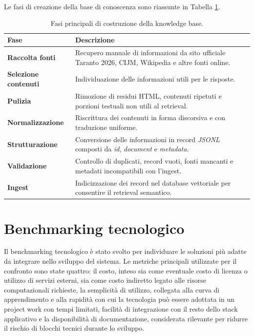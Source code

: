 Le fasi di creazione della base di conoscenza sono riassunte in Tabella \ref{tab:kb-pipeline}.

\begin{table}[H]
\centering
\renewcommand{\arraystretch}{1.25}
\begin{tabular}{p{} p{}}
\toprule
\textbf{Fase} & \textbf{Descrizione} \\
\midrule
\textbf{Raccolta fonti} & Recupero manuale di informazioni da sito ufficiale Taranto 2026, CIJM, Wikipedia e altre fonti online. \\
\textbf{Selezione contenuti} & Individuazione delle informazioni utili per le risposte. \\
\textbf{Pulizia} & Rimozione di residui HTML, contenuti ripetuti e porzioni testuali non utili al retrieval. \\
\textbf{Normalizzazione} & Riscrittura dei contenuti in forma discorsiva e con traduzione uniforme. \\
\textbf{Strutturazione} & Conversione delle informazioni in record \textit{JSONL} composti da \textit{id}, \textit{document} e \textit{metadata}. \\
\textbf{Validazione} & Controllo di duplicati, record vuoti, fonti mancanti e metadati incompatibili con l’ingest. \\
\textbf{Ingest} & Indicizzazione dei record nel database vettoriale per consentire il retrieval semantico. \\
\bottomrule
\end{tabular}
\caption{Fasi principali di costruzione della knowledge base.}\label{tab:kb-pipeline}
\end{table}

\section{Benchmarking tecnologico}

Il benchmarking tecnologico è stato svolto per individuare le soluzioni più adatte da integrare nello sviluppo del sistema. Le metriche principali utilizzate per il confronto sono state quattro: il costo, inteso sia come eventuale costo di licenza o utilizzo di servizi esterni, sia come costo indiretto legato alle risorse computazionali richieste, la semplicità di utilizzo, collegata alla curva di apprendimento e alla rapidità con cui la tecnologia può essere adottata in un project work con tempi limitati, facilità di integrazione con il resto dello stack applicativo e la disponibilità di documentazione, considerata rilevante per ridurre il rischio di blocchi tecnici durante lo sviluppo.

